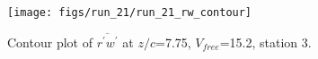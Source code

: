 \begin{figure}[H]
\centering
\texttt{[image: figs/run\_21/run\_21\_rw\_contour]}
\caption{Contour plot of $\overline{r^\prime w^\prime}$ at $z/c$=7.75, $V_{free}$=15.2, station 3.}
\label{fig:run_21_rw_contour}
\end{figure}


